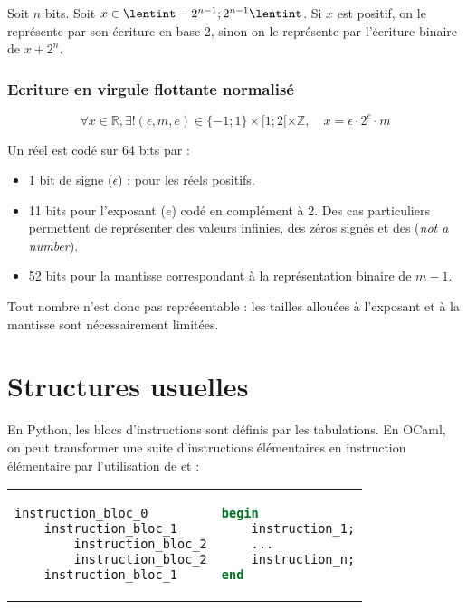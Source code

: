 \documentclass{hibiscus}
\begin{document}
\par Soit $n$ bits. Soit $x \in \lentint -2^{n-1}; 2^{n-1} \lentint$. Si $x$ est positif, on le représente par son écriture en base 2, sinon on le représente par l'écriture binaire de $x + 2^n$.

\subsubsection{Ecriture en virgule flottante normalisé}

$$ \forall x \in \mathbb{R}, \exists! (\epsilon, m, e) \in \{-1; 1\} \times [1; 2[ \times \mathbb{Z}, \quad x = \epsilon \cdot 2^e \cdot m $$

\par Un réel est codé sur 64 bits par :
\begin{itemize}
\item 1 bit de signe ($\epsilon$) :  pour les réels positifs.
\item 11 bits pour l'exposant ($e$) codé en complément à 2. Des cas particuliers permettent de représenter des valeurs infinies, des zéros signés et des  (\textit{not a number}).
\item 52 bits pour la mantisse correspondant à la représentation binaire de $m - 1$. 
\end{itemize}

\medskip \par Tout nombre n'est donc pas représentable : les tailles allouées à l'exposant et à la mantisse sont nécessairement limitées.


\newpage \section{Structures usuelles}

En Python, les blocs d'instructions sont définis par les tabulations. En OCaml, on peut transformer une suite d'instructions élémentaires en instruction élémentaire par l'utilisation de  et  :

\begin{tabular}{p{} p{}}
\begin{lstlisting}[language=Python]
instruction_bloc_0
    instruction_bloc_1
        instruction_bloc_2
        instruction_bloc_2
    instruction_bloc_1
\end{lstlisting}
&
\begin{lstlisting}[language=Caml]
begin
    instruction_1;
    ...
    instruction_n;
end
\end{lstlisting}
\end{tabular}
\end{document}
